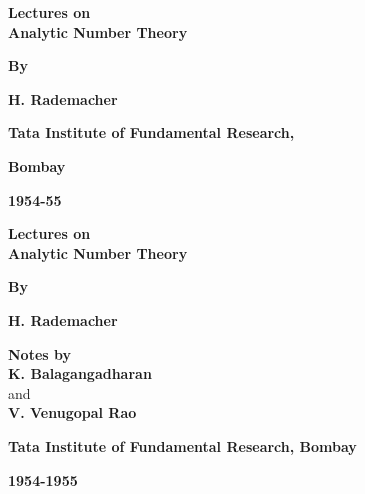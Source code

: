 \thispagestyle{empty}
\begin{center}
{\Large\bf Lectures on}\\[10pt] 
{\Large\bf Analytic Number Theory}
\vskip 1cm

{\bf By}
\medskip

{\large\bf  H. Rademacher}\\
\vfill


{\bf  Tata Institute of Fundamental Research,}

{\bf  Bombay}

{\bf  1954-55}
\end{center}

\eject

\thispagestyle{empty}
\begin{center}
{\Large\bf Lectures on}\\[10pt] 
{\Large\bf Analytic Number Theory}
\vskip 1cm

{\bf  By}
\medskip

{\large\bf  H. Rademacher}
\vfill

{\bf  Notes by}\\[10pt]
{\large\bf K. Balagangadharan}\\[5pt]
  and\\[5pt]
{\large\bf  V. Venugopal Rao}
\vfill

{\bf  Tata Institute of Fundamental Research, Bombay}

{\bf  1954-1955}
\end{center}
